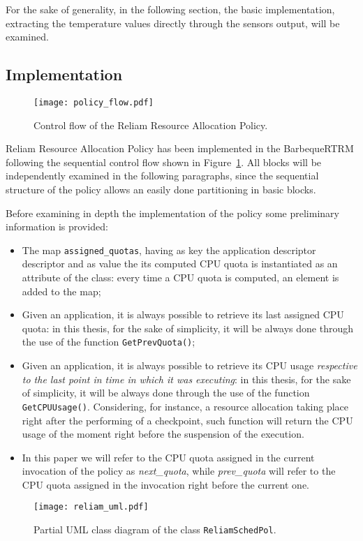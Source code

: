 For the sake of generality, in the following section, the basic implementation, extracting the temperature values directly through the sensors output, will be examined.

\subsection{Implementation}
\begin{figure}[t]
    \centering
    \texttt{[image: policy\_flow.pdf]}
    \caption{Control flow of the Reliam Resource Allocation Policy.}
    \label{fig:policyflow}
\end{figure}

Reliam Resource Allocation Policy has been implemented in the BarbequeRTRM following the sequential control flow shown in Figure~\ref{fig:policyflow}. All blocks will be independently examined in the following paragraphs, since the sequential structure of the policy allows an easily done partitioning in basic blocks. 

Before examining in depth the implementation of the policy some preliminary information is provided:
\begin{itemize}
\item The map \verb|assigned_quotas|, having as key the application descriptor descriptor and as value the its computed CPU quota is instantiated as an attribute of the class: every time a CPU quota is computed, an element is added to the map;
\item Given an application, it is always possible to retrieve its last assigned CPU quota: in this thesis, for the sake of simplicity, it will be always done through the use of the function \verb|GetPrevQuota()|;
\item Given an application, it is always possible to retrieve its CPU usage \emph{respective to the last point in time in which it was executing}: in this thesis, for the sake of simplicity, it will be always done through the use of the function \verb|GetCPUUsage()|. Considering, for instance, a resource allocation taking place right after the performing of a checkpoint, such function will return the CPU usage of the moment right before the suspension of the execution.
\item In this paper we will refer to the CPU quota assigned in the current invocation of the policy as \emph{next\_quota}, while \emph{prev\_quota} will refer to the CPU quota assigned in the invocation right before the current one.
\end{itemize}
\begin{figure}[t]
    \centering
    \texttt{[image: reliam\_uml.pdf]}
    \cprotect\caption{Partial UML class diagram of the class \verb|ReliamSchedPol|.}
    \label{fig:reliamuml}
\end{figure}

